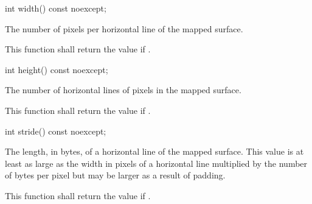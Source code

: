 \begin{itemdecl}
int width() const noexcept;
\end{itemdecl}
\begin{itemdescr}
\pnum
\returns
The number of pixels per horizontal line of the mapped surface.

\pnum
\remarks
This function shall return the value  if .
\end{itemdescr}

\begin{itemdecl}
int height() const noexcept;
\end{itemdecl}
\begin{itemdescr}
\pnum
\returns
The number of horizontal lines of pixels in the mapped surface.

\pnum
\remarks
This function shall return the value  if .
\end{itemdescr}

\begin{itemdecl}
int stride() const noexcept;
\end{itemdecl}
\begin{itemdescr}
\pnum
\returns
The length, in bytes, of a horizontal line of the mapped surface.
\enternote
This value is at least as large as the width in pixels of a horizontal line multiplied by the number of bytes per pixel but may be larger as a result of padding.
\exitnote

\pnum
\remarks
This function shall return the value  if .
\end{itemdescr}
